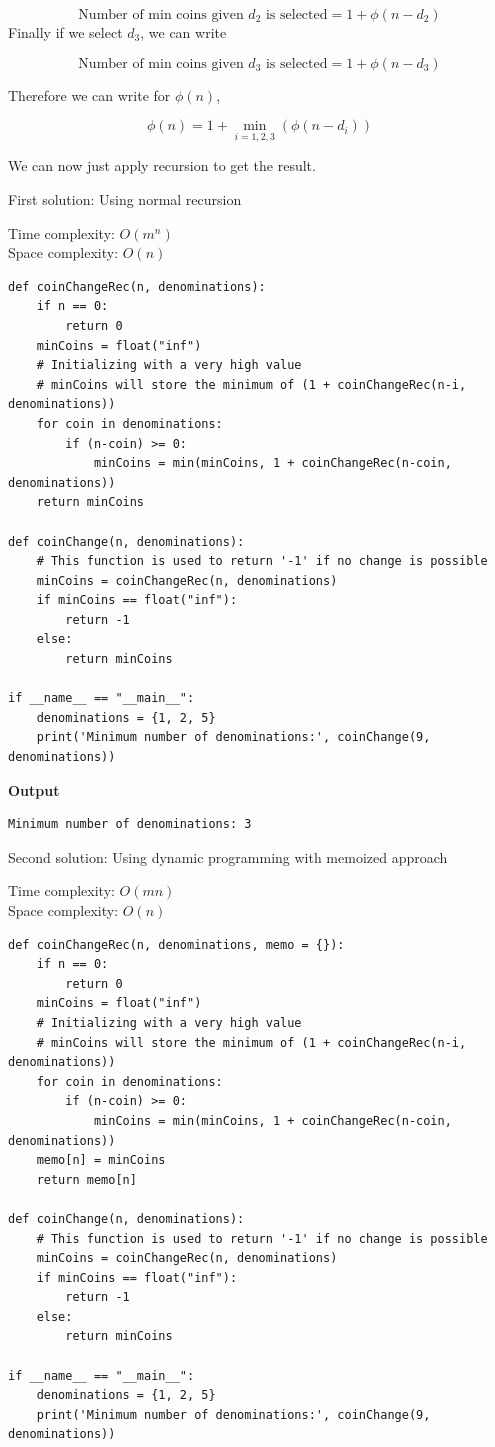 \documentclass[a4paper,11pt]{book}
\begin{document}
$$\text{Number of min coins given $d_2$ is selected} = 1 + \phi(n-d_2)$$
\noindent Finally if we select $d_3$, we can write

$$\text{Number of min coins given $d_3$ is selected} = 1 + \phi(n-d_3)$$

\noindent Therefore we can write for $\phi(n)$,

$$\phi(n) = 1 + \min_{i=1,2,3} \left(\phi(n-d_i)\right)$$

\noindent We can now just apply recursion to get the result.

\vspace{5mm}

\noindent First solution: Using normal recursion

\noindent Time complexity: $O(m^n)$\\
\noindent  Space complexity: $O(n)$

\begin{lstlisting}
def coinChangeRec(n, denominations):
    if n == 0:
        return 0
    minCoins = float("inf")  
    # Initializing with a very high value
    # minCoins will store the minimum of (1 + coinChangeRec(n-i, denominations))
    for coin in denominations:
        if (n-coin) >= 0:
            minCoins = min(minCoins, 1 + coinChangeRec(n-coin, denominations))
    return minCoins

def coinChange(n, denominations):
    # This function is used to return '-1' if no change is possible
    minCoins = coinChangeRec(n, denominations)
    if minCoins == float("inf"):
        return -1  
    else:
        return minCoins

if __name__ == "__main__":
    denominations = {1, 2, 5}
    print('Minimum number of denominations:', coinChange(9, denominations))
\end{lstlisting}
\textbf{Output}
\begin{lstlisting}
Minimum number of denominations: 3
\end{lstlisting}

\noindent Second solution: Using dynamic programming with memoized approach

\noindent Time complexity: $O(mn)$\\
\noindent  Space complexity: $O(n)$

\begin{lstlisting}
def coinChangeRec(n, denominations, memo = {}):
    if n == 0: 
        return 0
    minCoins = float("inf")  
    # Initializing with a very high value
    # minCoins will store the minimum of (1 + coinChangeRec(n-i, denominations))
    for coin in denominations:
        if (n-coin) >= 0:
            minCoins = min(minCoins, 1 + coinChangeRec(n-coin, denominations))
    memo[n] = minCoins
    return memo[n]

def coinChange(n, denominations):
    # This function is used to return '-1' if no change is possible
    minCoins = coinChangeRec(n, denominations)
    if minCoins == float("inf"):
        return -1  
    else:
        return minCoins

if __name__ == "__main__":
    denominations = {1, 2, 5}
    print('Minimum number of denominations:', coinChange(9, denominations))
\end{lstlisting}
\end{document}
